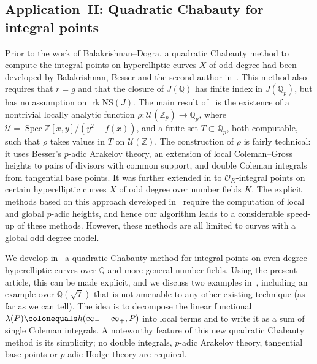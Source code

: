\documentclass[11pt, a4paper]{amsart}
\newcommand{\Q}{\mathbb{Q}}
\newcommand{\calU}{\mathcal{U}}
\newcommand{\Z}{\mathbb{Z}}
\renewcommand{\O}{\mathcal{O}}
\newcommand{\Spec}{\operatorname{Spec}}
\newcommand{\rk}{\operatorname{rk}}
\renewcommand{\O}{\mathcal{O}}
\theoremstyle{remark}
\numberwithin{equation}{section}
\begin{document}
\subsection{Application~II: Quadratic Chabauty for integral
points}\label{subsec:intro-QC-details}

Prior to the work of Balakrishnan--Dogra, a quadratic Chabauty method to
compute the integral points on hyperelliptic curves  $X$ of odd degree had been developed by
Balakrishnan, Besser and the
second author in~\cite{BBM1}.
This method also requires that $r=g$ and that the closure of
$J(\Q)$ has finite index in $J(\Q_p)$, but has no assumption on
$\rk\mathrm{NS}(J) $.
The main result of~\cite{BBM1} is the existence of a nontrivial locally
analytic function $\rho\colon \calU(\Z_p)\to \Q_p$, where
$\mathcal{U}=\Spec\Z[x,y]/(y^2-f(x))$, and a finite set $T\subset \Q_p$, both computable, such that $\rho$ takes values in $T$ on 
$\calU(\Z)$.
The construction of $\rho$ is fairly technical: it uses Besser's $p$-adic Arakelov theory, an extension of local Coleman--Gross heights to pairs of  
divisors with common support, and double Coleman integrals from tangential base points.
It was further extended in \cite{BBBM-QCNF} to $\O_K$-integral points on certain hyperelliptic curves $X$ of odd degree over number fields $K$. 
The explicit methods based on this approach developed in~\cite{BBM1, BBM2,
BBBM-QCNF} require the computation of local and global $p$-adic heights,
and hence our algorithm leads to a considerable speed-up of these methods. However, these methods are all limited to curves with a global odd degree model.

We develop in~\cite{LinQC} a quadratic Chabauty
method for integral points on even degree hyperelliptic curves over $\Q$
and more general number fields. Using the present article, this can be made explicit,
and we discuss two examples in~\cite{LinQC}, including an example over
$\Q(\sqrt{7})$ that is not amenable to any other existing technique (as far
as we can tell). The idea is to 
decompose the linear functional $\lambda(P)\colonequals
h(\infty_--\infty_+, P)$ into local terms and to write it as a sum of
single Coleman integrals.
A noteworthy feature of this new quadratic Chabauty
method is its simplicity; no double integrals, $p$-adic Arakelov theory,
tangential base points or
$p$-adic Hodge theory are required. 
\end{document}
